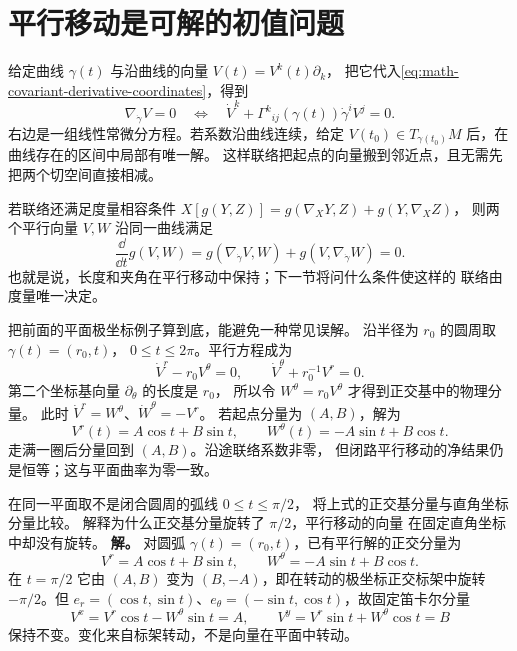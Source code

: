 \section{平行移动是可解的初值问题}

给定曲线 \(\gamma(t)\) 与沿曲线的向量 \(V(t)=V^k(t)\partial_k\)，
把它代入\cref{eq:math-covariant-derivative-coordinates}，得到
\[
\nabla_{\dot\gamma}V=0
\quad\Longleftrightarrow\quad
\dot V^k+\Gamma^k{}_{ij}(\gamma(t))
\dot\gamma^i V^j=0.
\]
右边是一组线性常微分方程。若系数沿曲线连续，给定
\(V(t_0)\in T_{\gamma(t_0)}M\) 后，在曲线存在的区间中局部有唯一解。
这样联络把起点的向量搬到邻近点，且无需先把两个切空间直接相减。

若联络还满足度量相容条件
\(X[g(Y,Z)]=g(\nabla_XY,Z)+g(Y,\nabla_XZ)\)，
则两个平行向量 \(V,W\) 沿同一曲线满足
\[
\frac{\dd}{\dd t}g(V,W)
=g(\nabla_{\dot\gamma}V,W)+g(V,\nabla_{\dot\gamma}W)=0.
\]
也就是说，长度和夹角在平行移动中保持；下一节将问什么条件使这样的
联络由度量唯一决定。

把前面的平面极坐标例子算到底，能避免一种常见误解。
沿半径为 \(r_0\) 的圆周取 \(\gamma(t)=(r_0,t)\)，
\(0\le t\le2\pi\)。平行方程成为
\[
\dot V^r-r_0V^\theta=0,
\qquad
\dot V^\theta+r_0^{-1}V^r=0.
\]
第二个坐标基向量 \(\partial_\theta\) 的长度是 \(r_0\)，
所以令 \(W^\theta=r_0V^\theta\) 才得到正交基中的物理分量。
此时 \(\dot V^r=W^\theta\)、\(\dot W^\theta=-V^r\)。
若起点分量为 \((A,B)\)，解为
\[
V^r(t)=A\cos t+B\sin t,
\qquad
W^\theta(t)=-A\sin t+B\cos t.
\]
走满一圈后分量回到 \((A,B)\)。沿途联络系数非零，
但闭路平行移动的净结果仍是恒等；这与平面曲率为零一致。



\par
\begin{workedexample}
在同一平面取不是闭合圆周的弧线 \(0\le t\le\pi/2\)，
将上式的正交基分量与直角坐标分量比较。
解释为什么正交基分量旋转了 \(\pi/2\)，平行移动的向量
在固定直角坐标中却没有旋转。
\textbf{解。} 对圆弧 \(\gamma(t)=(r_0,t)\)，已有平行解的正交分量为
\[
V^r=A\cos t+B\sin t,\qquad W^\theta=-A\sin t+B\cos t.
\]
在 \(t=\pi/2\) 它由 \((A,B)\) 变为 \((B,-A)\)，即在转动的极坐标正交标架中旋转 \(-\pi/2\)。但 \(e_r=(\cos t,\sin t)\)、\(e_\theta=(-\sin t,\cos t)\)，故固定笛卡尔分量
\[
V^x=V^r\cos t-W^\theta\sin t=A,\qquad
V^y=V^r\sin t+W^\theta\cos t=B
\]
保持不变。变化来自标架转动，不是向量在平面中转动。
\end{workedexample}
\par
